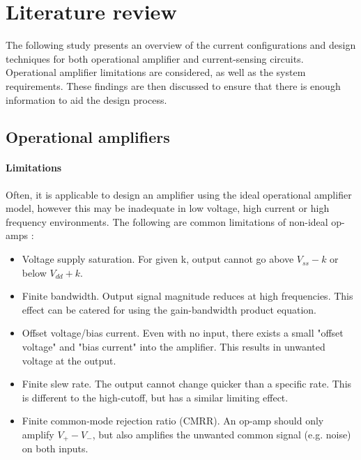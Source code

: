
\chapter{Literature review}\label{chap:Lit}

The following study presents an overview of the current configurations and design techniques for both operational amplifier and current-sensing circuits.
Operational amplifier limitations are considered, as well as the system requirements. These findings are then discussed to ensure that there is
enough information to aid the design process.

\section{Operational amplifiers}\label{sec:opamps}

\subsubsection{Limitations}\label{sec:opamps_limits}
Often, it is applicable to design an amplifier using the ideal operational amplifier model, however this may be inadequate
in low voltage, high current or high frequency environments. The following are common limitations of non-ideal op-amps \cite{WebsiteOpAmpLimitations}:
\begin{itemize}
    \item Voltage supply saturation. For given k, output cannot go above $V_{ss} - k$ or below  $V_{dd} + k$.
    \item Finite bandwidth. Output signal magnitude reduces at high frequencies. This effect can be catered for using the gain-bandwidth product equation.
    \item Offset voltage/bias current. Even with no input, there exists a small "offset voltage" and "bias current" into the amplifier.
          This results in unwanted voltage at the output.
    \item Finite slew rate. The output cannot change quicker than a specific rate. This is different to the high-cutoff, but has a similar limiting effect.
    \item Finite common-mode rejection ratio (CMRR). An op-amp should only amplify $V_{+} - V_{-}$, but also amplifies the unwanted common signal (e.g. noise) on both inputs.
\end{itemize}

